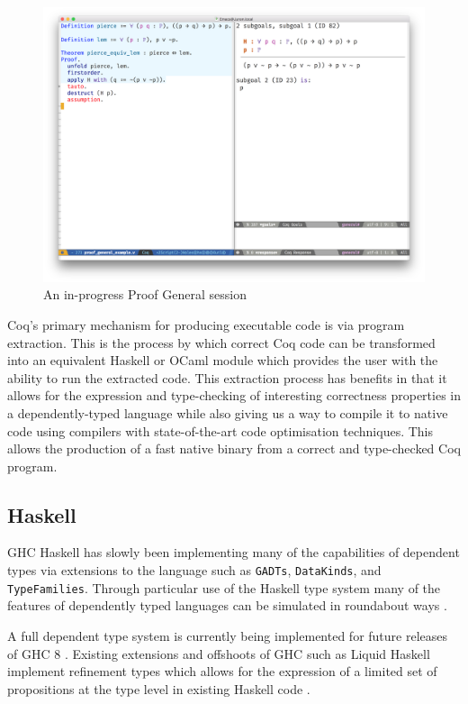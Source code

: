 \documentclass[a4paper, notitlepage]{report}
\begin{document}
\begin{figure}[H]
\centering
\includegraphics[width=0.85\linewidth]{./fig/proof_general.png}
\caption{An in-progress Proof General session}
\end{figure}

Coq's primary mechanism for producing executable code is via program extraction.
This is the process by which correct Coq code can be transformed into an
equivalent Haskell or OCaml module which provides the user with the ability to
run the extracted code. This extraction process has benefits in that it allows
for the expression and type-checking of interesting correctness properties in a
dependently-typed language while also giving us a way to compile it to native
code using compilers with state-of-the-art code optimisation techniques. This
allows the production of a fast native binary from a correct and type-checked
Coq program.

\subsection{Haskell}
\label{sec:orgd3ab824}
GHC Haskell has slowly been implementing many of the capabilities of dependent
types via extensions to the language such as \texttt{GADTs}, \texttt{DataKinds}, and
\texttt{TypeFamilies}. Through particular use of the Haskell type system many of the
features of dependently typed languages can be simulated in roundabout ways
\cite{mcbride_faking_2002,lindley_hasochism_2013}.

A full dependent type system is currently being implemented for future releases
of GHC 8 \cite{eisenberg_dependent_2016,weirich_specif_2017}. Existing
extensions and offshoots of GHC such as Liquid Haskell implement refinement
types which allows for the expression of a limited set of propositions at the
type level in existing Haskell code \cite{vazou_refinement_2014}.
\end{document}

